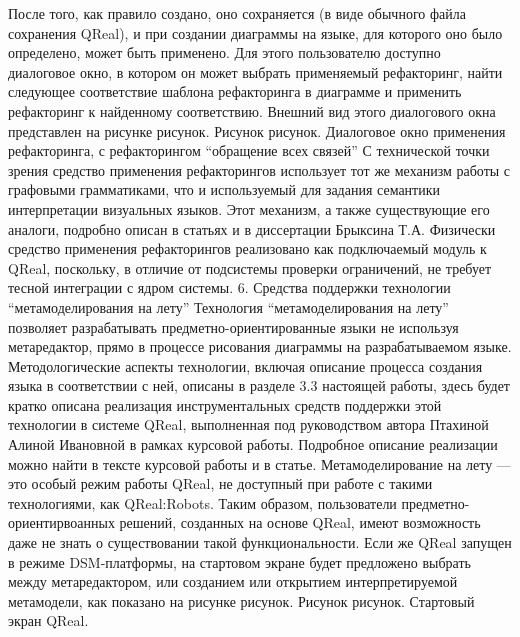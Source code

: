 	После того, как правило создано, оно сохраняется (в виде обычного файла сохранения QReal), и при создании диаграммы на языке, для которого оно было определено, может быть применено. Для этого пользователю доступно диалоговое окно, в котором он может выбрать применяемый рефакторинг, найти следующее соответствие шаблона рефакторинга в диаграмме и применить рефакторинг к найденному соответствию. Внешний вид этого диалогового окна представлен на рисунке рисунок.
Рисунок рисунок. Диалоговое окно применения рефакторинга, с рефакторингом “обращение всех связей”
	С технической точки зрения средство применения рефакторингов использует тот же механизм работы с графовыми грамматиками, что и используемый для задания семантики интерпретации визуальных языков. Этот механизм, а также существующие его аналоги, подробно описан в статьях и в диссертации Брыксина Т.А. Физически средство применения рефакторингов реализовано как подключаемый модуль к QReal, поскольку, в отличие от подсистемы проверки ограничений, не требует тесной интеграции с ядром системы.
6. Средства поддержки технологии “метамоделирования на лету”
	Технология “метамоделирования на лету” позволяет разрабатывать предметно-ориентированные языки не используя метаредактор, прямо в процессе рисования диаграммы на разрабатываемом языке. Методологические аспекты технологии, включая описание процесса создания языка в соответствии с ней, описаны в разделе 3.3 настоящей работы, здесь будет кратко описана реализация инструментальных средств поддержки этой технологии в системе QReal, выполненная под руководством автора Птахиной Алиной Ивановной в рамках курсовой работы. Подробное описание реализации можно найти в тексте курсовой работы и в статье.
	Метамоделирование на лету --- это особый режим работы QReal, не доступный при работе с такими технологиями, как QReal:Robots. Таким образом, пользователи предметно-ориентирвоанных решений, созданных на основе QReal, имеют возможность даже не знать о существовании такой функциональности. Если же QReal запущен в режиме DSM-платформы, на стартовом экране будет предложено выбрать между метаредактором, или созданием или открытием интерпретируемой метамодели, как показано на рисунке рисунок.
Рисунок рисунок. Стартовый экран QReal.

